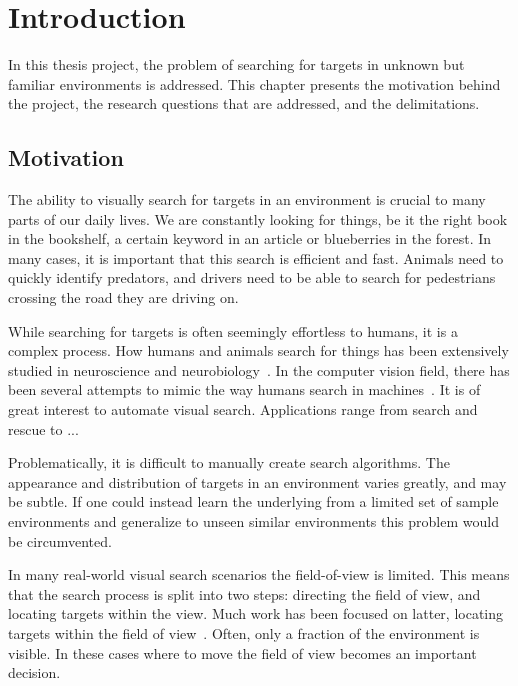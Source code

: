 \chapter{Introduction}
\label{cha:introduction}

In this thesis project, the problem of searching for targets in unknown but familiar environments is addressed. This chapter presents the motivation behind the project, the research questions that are addressed, and the delimitations. 

\section{Motivation}
\label{sec:motivation}

The ability to visually search for targets in an environment is crucial to many parts of our daily lives. We are constantly looking for things, be it the right book in the bookshelf, a certain keyword in an article or blueberries in the forest. In many cases, it is important that this search is efficient and fast. Animals need to quickly identify predators, and drivers need to be able to search for pedestrians crossing the road they are driving on.

While searching for targets is often seemingly effortless to humans, it is a complex process. How humans and animals search for things has been extensively studied in neuroscience and neurobiology~\cite{eckstein_visual_2011,wolfe_visual_2010,wolfe_guided_2021}. In the computer vision field, there has been several attempts to mimic the way humans search in machines~\cite{}. It is of great interest to automate visual search. Applications range from search and rescue to ...

Problematically, it is difficult to manually create search algorithms. The appearance and distribution of targets in an environment varies greatly, and may be subtle. If one could instead learn the underlying from a limited set of sample environments and generalize to unseen similar environments this problem would be circumvented.

In many real-world visual search scenarios the field-of-view is limited. This means that the search process is split into two steps: directing the field of view, and locating targets within the view. Much work has been focused on latter, locating targets within the field of view~\cite{}. Often, only a fraction of the environment is visible. In these cases where to move the field of view becomes an important decision.


